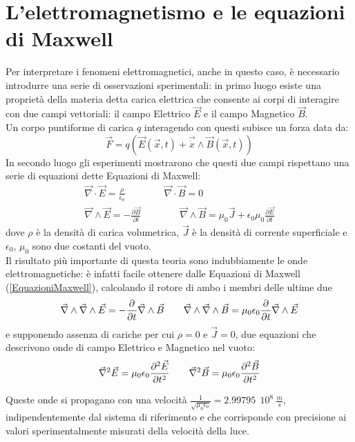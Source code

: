 \section{L'elettromagnetismo e le equazioni di Maxwell}
Per interpretare i fenomeni elettromagnetici, anche in questo caso, è necessario introdurre una serie di osservazioni sperimentali: in primo luogo esiste una proprietà della materia detta carica elettrica che consente ai corpi di interagire con due campi vettoriali: il campo Elettrico $\vec{E}$ e il campo Magnetico $\vec{B}$.\\ Un corpo puntiforme di carica $q$ interagendo con questi subisce un forza data da:
\begin{equation}
	\vec{F}=q(\vec{E}(\vec{x},t)+\vec{\dot{x}}\wedge\vec{B}(\vec{x},t))
	\label{ForzaLorentz}
\end{equation}
In secondo luogo gli esperimenti mostrarono che questi due campi rispettano una serie di equazioni dette Equazioni di Maxwell:
\begin{equation}
	\begin{gathered}
		\vec{\nabla}\cdot\vec{E}=\frac{\rho}{\epsilon_0} \qquad \qquad \vec{\nabla}\cdot\vec{B}=0 \\
		\vec{\nabla}\wedge\vec{E}=-\frac{\partial\vec{B}}{\partial t} \qquad \qquad \vec{\nabla}\wedge\vec{B}=\mu_0\vec{J}+\epsilon_0\mu_0\frac{\partial\vec{E}}{\partial t}
		\label{EquazioniMaxwell}
	\end{gathered}
\end{equation}
dove $\rho$ è la densità di carica volumetrica, $\vec{J}$ è la densità di corrente superficiale e $\epsilon_0$, $\mu_0$ sono due costanti del vuoto.\\

Il risultato più importante di questa teoria sono indubbiamente le onde elettromagnetiche: è infatti facile ottenere dalle Equazioni di Maxwell (\ref{EquazioniMaxwell}), calcolando il rotore di ambo i membri delle ultime due
\begin{equation*}
	\vec{\nabla}\wedge\vec{\nabla}\wedge\vec{E}=-\frac{\partial}{\partial t}\vec{\nabla}\wedge\vec{B} \qquad \vec{\nabla}\wedge\vec{\nabla}\wedge\vec{B}=\mu_0\epsilon_0\frac{\partial}{\partial t}\vec{\nabla}\wedge\vec{E}
\end{equation*}
e supponendo assenza di cariche per cui $\rho=0$ e $\vec{J}=0$, due equazioni che descrivono onde di campo Elettrico e Magnetico nel vuoto:
\begin{equation}
	\vec{\nabla}^2\vec{E}=\mu_0\epsilon_0\frac{\partial^2\vec{E}}{\partial t^2} \qquad \vec{\nabla}^2\vec{B}=\mu_0\epsilon_0\frac{\partial^2\vec{B}}{\partial t^2}
\end{equation}

Queste onde si propagano con una velocità $\frac{1}{\sqrt{\mu_0\epsilon_0}}=2.99795\ \ 10^8\  \frac{m}{s}$, indipendentemente dal sistema di riferimento e che corrisponde con precisione ai valori sperimentalmente misurati della velocità della luce.  